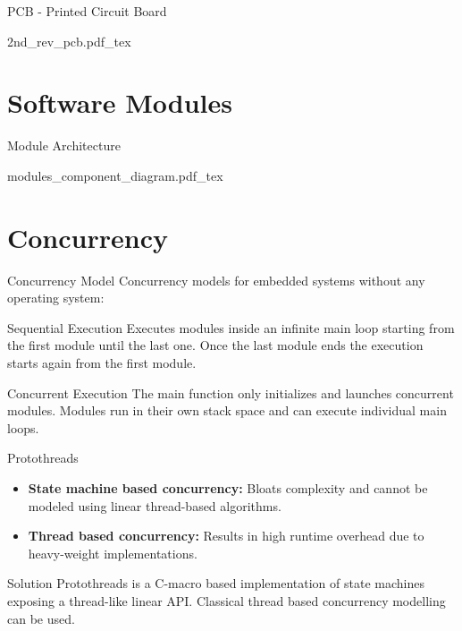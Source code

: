 \begin{frame}{PCB - Printed Circuit Board}
\begin{center}
\scalebox{0.59} {
    {2nd_rev_pcb.pdf_tex}
}
\end{center}
\end{frame}

\section{Software Modules}
\begin{frame}{Module Architecture}
\begin{center}
\scalebox{0.8} {
    {modules_component_diagram.pdf_tex}
}
\end{center} 
\end{frame}

\section{Concurrency}
\begin{frame}{Concurrency Model}
Concurrency models for embedded systems without any operating system:

\begin{block}{Sequential Execution}
Executes modules inside an infinite main loop starting from the first module until the last one.
Once the last module ends the execution starts again from the first module.
\end{block}
\begin{block}{Concurrent Execution}
The main function only initializes and launches concurrent modules. Modules run in their own stack space and can execute individual main loops.
\end{block}
\end{frame}

\begin{frame}{Protothreads}
\begin{itemize}
    \item \textbf{State machine based concurrency:} Bloats complexity and cannot be modeled using linear thread-based algorithms.
    \item \textbf{Thread based concurrency:} Results in high runtime overhead due to heavy-weight implementations.
\end{itemize}

\begin{exampleblock}{Solution}
Protothreads is a C-macro based implementation of state machines exposing a thread-like linear API.  Classical thread based concurrency modelling can be used.
\end{exampleblock}

\end{frame}

